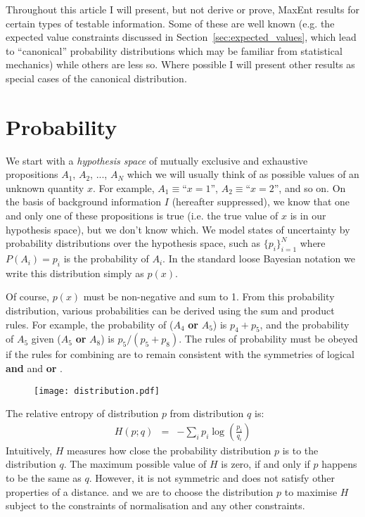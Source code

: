 \documentclass[a4paper, 11pt]{article}
\begin{document}
Throughout this article I will present, but not derive or prove, MaxEnt
results for certain types of testable information. Some of these are well
known (e.g. the expected value constraints discussed in
Section~\ref{sec:expected_values}, which lead to ``canonical'' probability
distributions which may be familiar from statistical mechanics) while others
are less so. Where possible I will present other results as special cases of
the canonical distribution.

\section{Probability}
We start with a {\it hypothesis space} of mutually exclusive and
exhaustive propositions $A_1$, $A_2$, ..., $A_N$ which we will usually
think of as possible values of an unknown quantity $x$. For example,
$A_1 \equiv $``$x=1$'', $A_2 \equiv $``$x=2$'', and so on.
On the basis of background
information $I$ (hereafter suppressed), we know that one and only one of these
propositions is true (i.e. the true value of $x$ is in our hypothesis space),
but we don't know which. We model states of
uncertainty by probability distributions over the hypothesis space,
such as $\{p_i\}_{i=1}^N$ where $P(A_i) = p_i$ is the probability of $A_i$.
In the standard loose Bayesian notation we write this distribution simply
as $p(x)$.

Of course, $p(x)$ must be non-negative and sum to 1.
From this probability distribution, various probabilities can be derived
using the sum and product rules. For example, the probability of
($A_4$ {\bf or} $A_5$) is $p_4 + p_5$, and the probability of $A_5$ given
($A_5$ {\bf or} $A_8$) is $p_5/(p_5 + p_8)$. The rules of probability must
be obeyed if the rules for combining are to remain consistent
with the symmetries of logical {\bf and} and {\bf or}
\citep{2010arXiv1008.4831K}.

\begin{figure}
\begin{center}
\texttt{[image: distribution.pdf]}
\caption{\label{fig:distribution}}
\end{center}
\end{figure}

The relative entropy of distribution $p$ from distribution $q$ is:
\begin{eqnarray}
H(p; q) &=& -\sum_i p_i \log\left(\frac{p_i}{q_i}\right) 
\end{eqnarray}
Intuitively, $H$ measures how close the probability distribution $p$ is
to the distribution $q$. The maximum possible value of $H$ is zero, if
and only if $p$ happens to be the same as $q$.
However, it is not symmetric and does not satisfy
other properties of a distance.
and we are to choose the distribution $p$ to maximise $H$ subject to the
constraints of normalisation and any other constraints.
\end{document}
